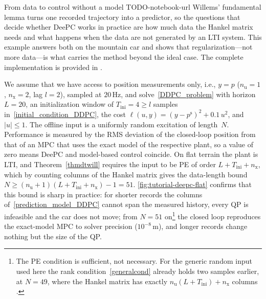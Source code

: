 
\begin{tutorialexample}[label={ex:deepc}]
    {From data to control without a model}
    {TODO-notebook-url}
  Willems' fundamental lemma turns one recorded trajectory into a predictor, so the questions that decide whether DeePC works in practice are how much data the Hankel matrix needs and what happens when the data are not generated by an \ac{LTI} system. This example answers both on the mountain car and shows that regularization---not more data---is what carries the method beyond the ideal case. The complete implementation is provided in \cite[Ex.~9.7--9.9]{cfr-nootbook}.

  We assume that we have access to position measurements only, i.e., $y=p$ ($n_\mathrm{u}=1$, $n_\mathrm{x}=2$, lag $l=2$), sampled at $20\,\mathrm{Hz}$, and solve~\eqref{DDPC_problem} with horizon $L=20$, an initialization window of $T_\mathrm{ini}=4\ge l$ samples in~\eqref{initial_condition_DDPC}, the cost $\ell(u,y)=(y-p^\mathrm{s})^2+0.1\,u^2$, and $|u|\le 1$. The offline input is a uniformly random excitation of length~$N$. Performance is measured by the \ac{RMS} deviation of the closed-loop position from that of an \ac{MPC} that uses the exact model of the respective plant, so a value of zero means DeePC and model-based control coincide. On flat terrain the plant is \ac{LTI}, and Theorem~\ref{thmdtwill} requires the input to be \ac{PE} of order $L+T_\mathrm{ini}+n_\mathrm{x}$, which by counting columns of the Hankel matrix gives the data-length bound $N\ge(n_\mathrm{u}+1)(L+T_\mathrm{ini}+n_\mathrm{x})-1=51$. \autoref{fig:tutorial-deepc-flat} confirms that this bound is sharp in practice: for shorter records the columns of~\eqref{prediction_model_DDPC} cannot span the measured history, every \ac{QP} is infeasible and the car does not move; from $N=51$ on\footnote{The \ac{PE} condition is sufficient, not necessary. For the generic random input used here the rank condition~\eqref{generalcond} already holds two samples earlier, at $N=49$, where the Hankel matrix has exactly $n_\mathrm{u}(L+T_\mathrm{ini})+n_\mathrm{x}$ columns \cite{MarkovskyDor2023}.} the closed loop reproduces the exact-model \ac{MPC} to solver precision ($10^{-8}\,\mathrm{m}$), and longer records change nothing but the size of the \ac{QP}.


\end{tutorialexample}

